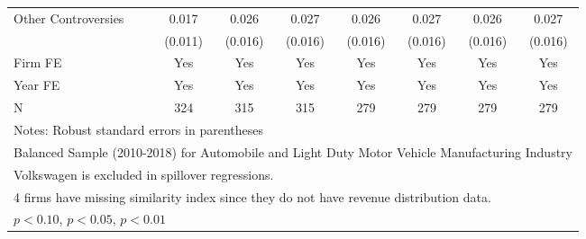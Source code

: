 \begin{table}[htbp]
\begin{tabular}{l*{7}{c}}
Other Controversies &       0.017         &       0.026         &       0.027\sym{*}  &       0.026         &       0.027\sym{*}  &       0.026         &       0.027\sym{*}  \\
                    &     (0.011)         &     (0.016)         &     (0.016)         &     (0.016)         &     (0.016)         &     (0.016)         &     (0.016)         \\
\midrule
Firm FE             &         Yes         &         Yes         &         Yes         &         Yes         &         Yes         &         Yes         &         Yes         \\
Year FE             &         Yes         &         Yes         &         Yes         &         Yes         &         Yes         &         Yes         &         Yes         \\
N                   &         324         &         315         &         315         &         279         &         279         &         279         &         279         \\
\bottomrule
\multicolumn{8}{l}{\footnotesize Notes: Robust standard errors in parentheses}\\
\multicolumn{8}{l}{\footnotesize Balanced Sample (2010-2018) for Automobile and Light Duty Motor Vehicle Manufacturing Industry}\\
\multicolumn{8}{l}{\footnotesize Volkswagen is excluded in spillover regressions.}\\
\multicolumn{8}{l}{\footnotesize 4 firms have missing similarity index since they do not have revenue distribution data.}\\
\multicolumn{8}{l}{\footnotesize \sym{*} \(p<0.10\), \sym{**} \(p<0.05\), \sym{***} \(p<0.01\)}\\
\end{tabular}
\end{table}
